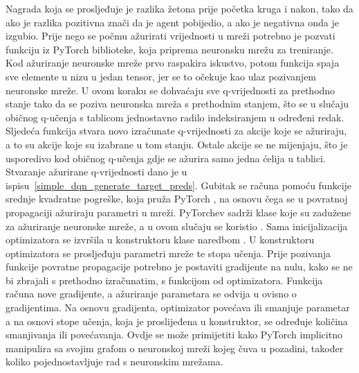 Nagrada koja se prosljeđuje je razlika žetona prije početka kruga i nakon, tako da ako je razlika pozitivna znači da je agent pobijedio, a ako je negativna onda je izgubio. Prije nego se počmu ažurirati vrijednosti u mreži potrebno je pozvati  funkciju iz PyTorch biblioteke, koja priprema neuronsku mrežu za treniranje. Kod ažuriranje neuronske mreže prvo raspakira iskustvo, potom funkcija  spaja sve elemente u nizu u jedan tensor, jer se to očekuje kao ulaz pozivanjem neuronske mreže. U ovom koraku se dohvaćaju sve q-vrijednosti za prethodno stanje tako da se poziva neuronska mreža s prethodnim stanjem, što se u slučaju običnog q-učenja s tablicom jednostavno radilo indeksiranjem u određeni redak. Sljedeća funkcija  stvara novo izračunate q-vrijednosti za akcije koje se ažuriraju, a to su akcije koje su izabrane u tom stanju. Ostale akcije se ne mijenjaju, što je usporedivo kod običnog q-učenja gdje se ažurira samo jedna ćelija u tablici. Stvaranje ažurirane q-vrijednosti dano je u ispisu~\ref{simple_dqn_generate_target_preds}. Gubitak se računa pomoću funkcije srednje kvadratne pogreške, koja pruža PyTorch , na osnovu čega se u povratnoj propagaciji ažuriraju parametri u mreži. PyTorchev  sadrži klase koje su zadužene za ažuriranje neuronske mreže, a u ovom slučaju se koristio . Sama inicijalizacija optimizatora se izvršila u konstruktoru klase naredbom . U konstruktoru optimizatora se prosljeđuju parametri mreže te stopa učenja. Prije pozivanja funkcije povratne propagacije potrebno je postaviti gradijente na nulu, kako se ne bi zbrajali s prethodno izračunatim, s funkcijom  od optimizatora. Funkcija  računa nove gradijente, a ažuriranje parametara se odvija u  ovisno o gradijentima. Na osnovu gradijenta, optimizator povećava ili smanjuje parametar a na osnovi stope učenja, koja je proslijeđena u konstruktor, se određuje količina smanjivanja ili povećavanja. Ovdje se može primijetiti kako PyTorch implicitno manipulira sa svojim grafom o neuronskoj mreži kojeg čuva u pozadini, također koliko pojednostavljuje rad s neuronskim mrežama.


